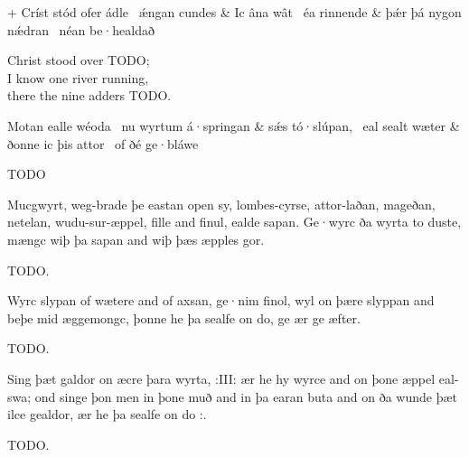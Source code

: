 \bvg{}
\bva[]+ Críst stód ofer ádle \hld\ ǽngan cundes &
Ic âna wât \hld\ éa rinnende &
þǽr þá nygon nǽdran \hld\ néan be·healdað\eva

\bvb Christ stood over TODO; \\
I know one river running, \\
there the nine adders TODO.\evb\evg


\bvg{}
\bva[]Motan ealle wéoda \hld\ nu wyrtum á·springan &
sǽs tó·slúpan, \hld\ eal sealt wæter &
ðonne ic þis attor \hld\ of ðé ge·bláwe\eva

\bvb TODO\evb\evg


\bpg\bpa Mucgwyrt, weg-brade þe eastan open sy, lombes-cyrse, attor-laðan, mageðan, netelan, wudu-sur-æppel, fille and finul, ealde sapan. Ge·wyrc ða wyrta to duste, mængc wiþ þa sapan and wiþ þæs æpples gor.\epa

\bpb TODO.\epb\epg


\bpg\bpa Wyrc slypan of wætere and of axsan, ge·nim finol, wyl on þære slyppan and beþe mid æggemongc, þonne he þa sealfe on do, ge ær ge æfter.\epa

\bpb TODO.\epb\epg


\bpg\bpa Sing þæt galdor on æcre þara wyrta, :III: ær he hy wyrce and on þone æppel eal-swa; ond singe þon men in þone muð and in þa earan buta and on ða wunde þæt ilce gealdor, ær he þa sealfe on do :.\epa

\bpb TODO.\epb\epg

\sectionline
